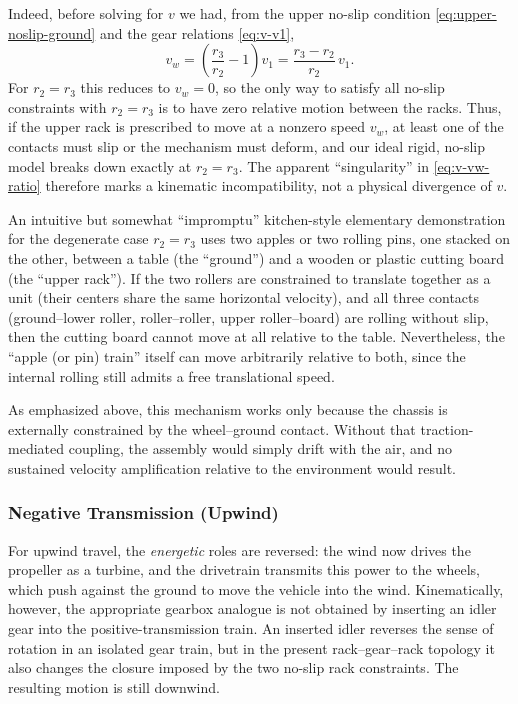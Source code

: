\documentclass[a4paper]{article}
\begin{document}
Indeed, before solving for $v$ we had, from the upper no-slip condition
\eqref{eq:upper-noslip-ground} and the gear relations \eqref{eq:v-v1},
\[
v_w = \left(\frac{r_3}{r_2} - 1\right)v_1
     = \frac{r_3 - r_2}{r_2}\,v_1.
\]
For $r_2 = r_3$ this reduces to  $v_w = 0$,
so the only way to satisfy all no-slip constraints with $r_2 = r_3$ is to
have zero relative motion between the racks. Thus, if the upper rack is
prescribed to move at a nonzero speed $v_w$, at least one of the contacts
must slip or the mechanism must deform, and our ideal rigid, no-slip model
breaks down exactly at $r_2 = r_3$. The apparent ``singularity'' in
\eqref{eq:v-vw-ratio} therefore marks a kinematic incompatibility, not a
physical divergence of $v$.

An intuitive but somewhat ``impromptu'' kitchen-style elementary demonstration for the degenerate case $r_2 = r_3$ uses two apples or two rolling pins, one stacked on the other, between a table (the ``ground'') and a wooden or plastic cutting board (the ``upper rack'').
If the two rollers are constrained to translate together as a unit (their centers share the same horizontal velocity), and all three contacts (ground--lower roller, roller--roller, upper roller--board) are rolling without slip, then the cutting board cannot move at all relative to the table. Nevertheless, the ``apple (or pin) train'' itself can move arbitrarily relative to both, since the internal rolling still admits a free translational speed.

As emphasized above, this mechanism works only because the chassis is externally
constrained by the wheel--ground contact. Without that traction-mediated
coupling, the assembly would simply drift with the air, and no sustained
velocity amplification relative to the environment would result.

\subsubsection{Negative Transmission (Upwind)}

For upwind travel, the \emph{energetic} roles are reversed: the wind now drives
the propeller as a turbine, and the drivetrain transmits this power to the
wheels, which push against the ground to move the vehicle into the wind.
Kinematically, however, the appropriate gearbox analogue is not obtained by
inserting an idler gear into the positive-transmission train.  An inserted
idler reverses the sense of rotation in an isolated gear train, but in the
present rack--gear--rack topology it also changes the closure imposed by the
two no-slip rack constraints.  The resulting motion is still downwind.
\end{document}
